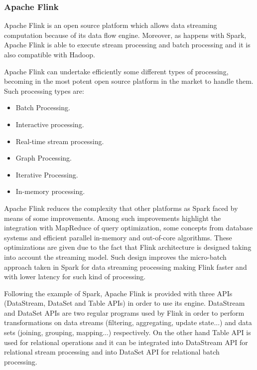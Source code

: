 \subsubsection{Apache Flink}

Apache Flink is an open source platform which allows data streaming computation because of its data flow engine. Moreover, as happens with Spark, Apache Flink is able to execute stream processing and batch processing and it is also compatible with Hadoop.

Apache Flink can undertake efficiently some different types of processing, becoming in the most potent open source platform in the market to handle them. Such processing types are:

\begin{itemize}

\item Batch Processing.
\item Interactive processing.
\item Real-time stream processing.
\item Graph Processing.
\item Iterative Processing.
\item In-memory processing.

\end{itemize}

Apache Flink reduces the complexity that other platforms as Spark faced by means of some improvements. Among such improvements highlight the integration with MapReduce of query optimization, some concepts from database systems and efficient parallel in-memory and out-of-core algorithms. These optimizations are given due to the fact that Flink architecture is designed taking into account the streaming model. Such design improves the micro-batch approach taken in Spark for data streaming processing making Flink faster and with lower latency for such kind of processing.

Following the example of Spark, Apache Flink is provided with three APIs (DataStream, DataSet and Table APIs) in order to use its engine. DataStream and DataSet APIs are two regular programs used by Flink in order to perform transformations on data streams (filtering, aggregating, update state...) and data sets (joining, grouping, mapping...) respectively. On the other hand Table API is used for relational operations and it can be integrated into DataStream API for relational stream processing and into DataSet API for relational batch processing.

